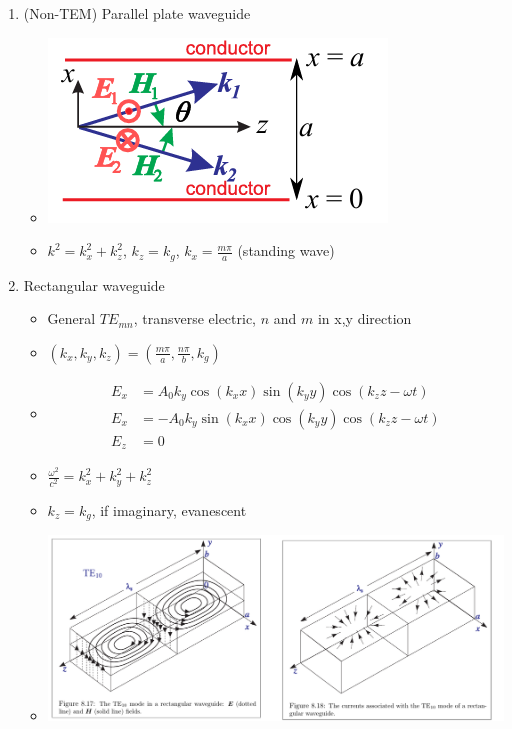 \documentclass{article}
\theoremstyle{remark}
\begin{document}
\begin{enumerate}
    \item (Non-TEM) Parallel plate waveguide \begin{itemize}
            \item \includegraphics*[width=0.5\linewidth]{waveguide.png}
            \item $k^2=k_x^2+k_z^2$, $k_z=k_g$, $k_x=\frac{m\pi}{a}$ (standing wave)
        \end{itemize}
    \item Rectangular waveguide\begin{itemize}
            \item General $TE_{mn}$, transverse electric, $n$ and $m$ in x,y direction
            \item $(k_x,k_y,k_z)=\left(\frac{m\pi}{a},\frac{n\pi}{b},k_g\right)$
            \item \begin{align*}
                    E_x &= A_0k_y\cos(k_x x)\sin(k_y y)\cos(k_z z-\omega t)\\
                    E_x &= -A_0k_y\sin(k_x x)\cos(k_y y)\cos(k_z z-\omega t)\\
                    E_z&=0
                \end{align*}
            \item $\frac{\omega^2}{c^2}=k_x^2+k_y^2+k_z^2$
            \item $k_z=k_g$, if imaginary, evanescent
            \item \includegraphics*[width=\linewidth]{rect_waveguide.png}
        \end{itemize}
\end{enumerate}
\end{document}

